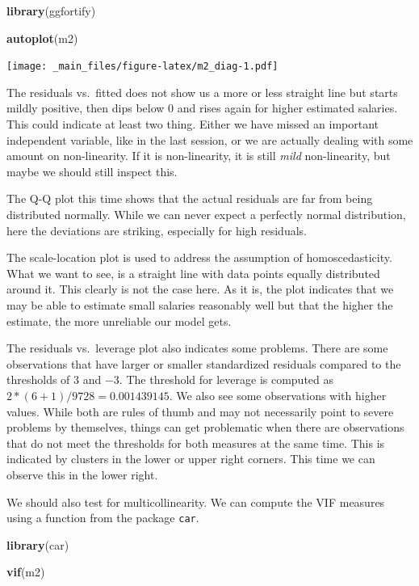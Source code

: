 \documentclass[
]{book}
\newenvironment{Shaded}{\begin{snugshade}}{\end{snugshade}}
\newcommand{\FunctionTok}[1]{\textcolor[rgb]{0.13,0.29,0.53}{\textbf{#1}}}
\newcommand{\NormalTok}[1]{#1}
\begin{document}
\begin{Shaded}
\begin{Highlighting}[]
\FunctionTok{library}\NormalTok{(ggfortify)}

\FunctionTok{autoplot}\NormalTok{(m2)}
\end{Highlighting}
\end{Shaded}

\texttt{[image: \_main\_files/figure-latex/m2\_diag-1.pdf]}

The residuals vs.~fitted does not show us a more or less straight line but
starts mildly positive, then dips below \(0\) and rises again for higher estimated
salaries. This could indicate at least two thing. Either we have missed an
important independent variable, like in the last session, or we are actually
dealing with some amount on non-linearity. If it is non-linearity, it is still
\emph{mild} non-linearity, but maybe we should still inspect this.

The Q-Q plot this time shows that the actual residuals are far from being
distributed normally. While we can never expect a perfectly normal distribution,
here the deviations are striking, especially for high residuals.

The scale-location plot is used to address the assumption of homoscedasticity.
What we want to see, is a straight line with data points equally distributed
around it. This clearly is not the case here. As it is, the plot indicates
that we may be able to estimate small salaries reasonably well but that the
higher the estimate, the more unreliable our model gets.

The residuals vs.~leverage plot also indicates some problems. There are some
observations that have larger or smaller standardized residuals compared to the
thresholds of \(3\) and \(-3\). The threshold for leverage is computed as
\(2 * (6 + 1) / 9728 = 0.001439145\). We also see some observations with higher
values. While both are rules of thumb and may not necessarily point to severe
problems by themselves, things can get problematic when there are observations
that do not meet the thresholds for both measures at the same time. This is
indicated by clusters in the lower or upper right corners. This time we can
observe this in the lower right.

We should also test for multicollinearity. We can compute the VIF measures using
a function from the package \texttt{car}.

\begin{Shaded}
\begin{Highlighting}[]
\FunctionTok{library}\NormalTok{(car)}

\FunctionTok{vif}\NormalTok{(m2)}
\end{Highlighting}
\end{Shaded}
\end{document}

